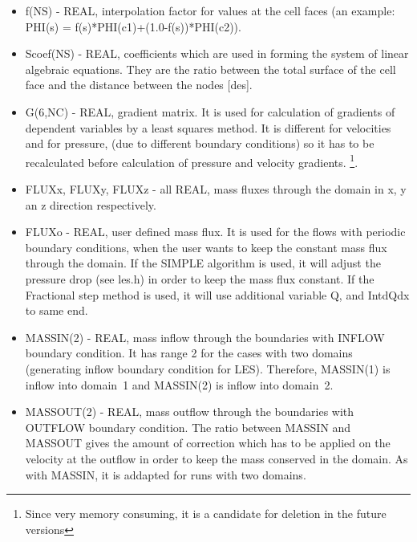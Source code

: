 \documentclass[10pt]{article}
\newcommand*{\tc}{\ttfamily} %
\begin{document}
\begin{itemize}
    \item
    {\tc f(NS)} - REAL, interpolation factor for values at the cell
      faces (an example: {\tc PHI(s) = f(s)*PHI(c1)+(1.0-f(s))*PHI(c2))}.

    \item
    {\tc Scoef(NS)} - REAL, coefficients which are used in forming the 
      system of linear algebraic equations. They are the ratio between
      the total surface of the cell face and the distance between the
      nodes [des].

    \item
    {\tc G(6,NC)} - REAL, gradient matrix. It is used for calculation
      of gradients of dependent variables by a least squares
      method. It is different for velocities and for pressure, 
      (due to different boundary conditions) so it has to be
      recalculated before calculation of pressure and velocity 
      gradients. 
      \footnote{Since very memory consuming, it is a candidate for
      deletion in the future versions}.

    \item
    {\tc FLUXx, FLUXy, FLUXz} - all REAL, mass fluxes through the
      domain in x, y an z direction respectively.

    \item
    {\tc FLUXo} - REAL, user defined mass flux. It is used for the
      flows with periodic boundary conditions, when the user
      wants to keep the constant mass flux through the domain.
      If the SIMPLE algorithm is used, it will adjust the 
      pressure drop (see les.h) in order to keep the mass flux
      constant. If the Fractional step method is used, it will
      use additional variable Q, and IntdQdx to same end.

    \item
    {\tc MASSIN(2)} - REAL, mass inflow through the boundaries with INFLOW
      boundary condition. It has range 2 for the cases with two domains
      (generating inflow boundary condition for LES). Therefore, {\tc MASSIN(1)}
      is inflow into domain~1 and  {\tc MASSIN(2)} is inflow into domain~2.

    \item
    {\tc MASSOUT(2)} - REAL, mass outflow through the boundaries with OUTFLOW
      boundary condition. The ratio between MASSIN and MASSOUT gives
      the amount of correction which has to be applied on the velocity 
      at the outflow in order to keep the mass conserved in the domain. As with
      {\tc MASSIN}, it is addapted for runs with two domains.


\end{itemize}
\end{document}
